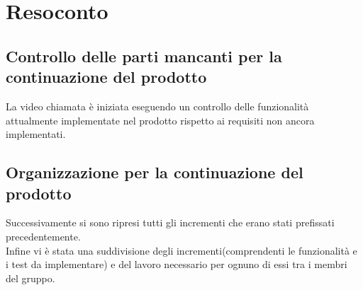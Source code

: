 \section{Resoconto}
\subsection{Controllo delle parti mancanti per la continuazione del prodotto}
La video chiamata è iniziata eseguendo un controllo delle funzionalità attualmente implementate nel prodotto rispetto ai requisiti non ancora implementati.\\
\subsection{Organizzazione per la continuazione del prodotto}
Successivamente si sono ripresi tutti gli incrementi che erano stati prefissati precedentemente.\\
Infine vi è stata una suddivisione degli incrementi(comprendenti le funzionalità e i test da implementare) e del lavoro necessario per ognuno di essi tra i membri del gruppo.
